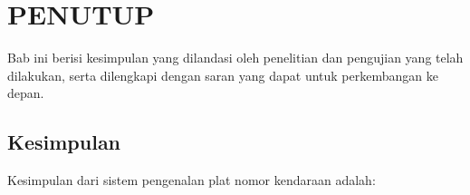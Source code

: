 \chapter{PENUTUP}

%
\vspace{4.5pt}
\noindent Bab ini berisi kesimpulan yang dilandasi oleh penelitian dan pengujian yang telah dilakukan, serta dilengkapi dengan saran yang dapat untuk perkembangan ke depan.\\

\section{Kesimpulan}
\noindent Kesimpulan dari sistem pengenalan plat nomor kendaraan adalah:
